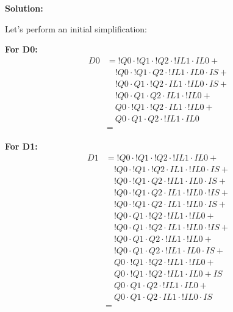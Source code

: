 \textbf{Solution:}

\noindent
Let's perform an initial simplification:

\textbf{For D0:}
\begin{align*}
    D0 &= !Q0 \cdot !Q1 \cdot !Q2 \cdot !IL1 \cdot IL0 + \\
       &\quad !Q0 \cdot !Q1 \cdot Q2 \cdot !IL1 \cdot IL0 \cdot IS + \\
       &\quad !Q0 \cdot Q1 \cdot !Q2 \cdot IL1 \cdot !IL0 \cdot IS + \\
       &\quad !Q0 \cdot Q1 \cdot Q2 \cdot IL1 \cdot !IL0 + \\
       &\quad Q0 \cdot !Q1 \cdot !Q2 \cdot IL1 \cdot !IL0 + \\
       &\quad Q0 \cdot Q1 \cdot Q2 \cdot !IL1 \cdot IL0 \\
    &= 
\end{align*}

\textbf{For D1:}
\begin{align*}
    D1 &= !Q0 \cdot !Q1 \cdot !Q2 \cdot !IL1 \cdot IL0 + \\
       &\quad !Q0 \cdot !Q1 \cdot !Q2 \cdot IL1 \cdot !IL0 \cdot IS + \\
       &\quad !Q0 \cdot !Q1 \cdot Q2 \cdot !IL1 \cdot IL0 \cdot IS + \\
       &\quad !Q0 \cdot !Q1 \cdot Q2 \cdot IL1 \cdot !IL0 \cdot !IS + \\
       &\quad !Q0 \cdot !Q1 \cdot Q2 \cdot IL1 \cdot !IL0 \cdot IS + \\
       &\quad !Q0 \cdot Q1 \cdot !Q2 \cdot !IL1 \cdot !IL0 + \\
       &\quad !Q0 \cdot Q1 \cdot !Q2 \cdot IL1 \cdot !IL0 \cdot !IS + \\
       &\quad !Q0 \cdot Q1 \cdot Q2 \cdot !IL1 \cdot !IL0+ \\
       &\quad !Q0 \cdot Q1 \cdot Q2 \cdot !IL1 \cdot IL0 \cdot IS + \\
       &\quad Q0 \cdot !Q1 \cdot !Q2 \cdot !IL1 \cdot !IL0 + \\
       &\quad Q0 \cdot !Q1 \cdot !Q2 \cdot !IL1 \cdot IL0 + IS \\
       &\quad Q0 \cdot Q1 \cdot Q2 \cdot !IL1 \cdot IL0 + \\
       &\quad Q0 \cdot Q1 \cdot Q2 \cdot IL1 \cdot !IL0 \cdot IS \\
    &= 
\end{align*}

